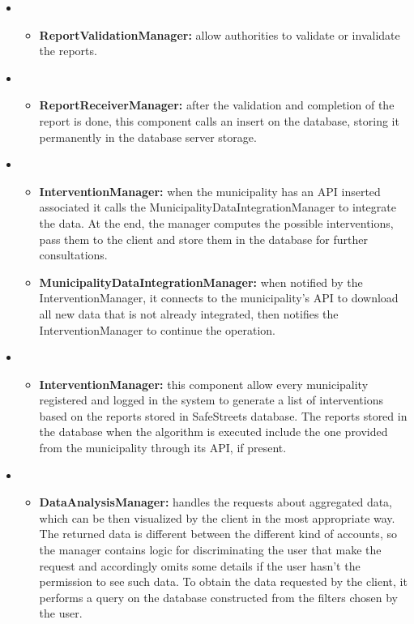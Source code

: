 \bigskip
\begin{itemize}[label={}]
	\item {}
	\begin{itemize}
		\item \textbf{ReportValidationManager:} allow authorities to validate or invalidate the reports.
	\end{itemize}
	\item {}
	\begin{itemize}
		\item \textbf{ReportReceiverManager:} after the validation and completion of the report is done, this component calls an insert on the database, storing it permanently in the database server storage.
	\end{itemize}
	\item {}
	\begin{itemize}
		\item \textbf{InterventionManager:}  when the municipality has an API inserted associated it calls the MunicipalityDataIntegrationManager to integrate the data. At the end, the manager computes the possible interventions, pass them to the client and store them in the database for further consultations.
		\item \textbf{MunicipalityDataIntegrationManager:} when notified by the InterventionManager, it connects to the municipality's API to download all new data that is not already integrated, then notifies the InterventionManager to continue the operation.
	\end{itemize}
	\item {}
	\begin{itemize}
		\item \textbf{InterventionManager:} this component allow every municipality registered and logged in the system to generate a list of interventions based on the reports stored in SafeStreets database. The reports stored in the database when the algorithm is executed include the one provided from the municipality through its API, if present.
	\end{itemize}
	\item {}
	\begin{itemize}
		\item \textbf{DataAnalysisManager:} handles the requests about aggregated data, which can be then visualized by the client in the most appropriate way. The returned data is different between the different kind of accounts, so the manager contains logic for discriminating the user that make the request and accordingly omits some details if the user hasn't the permission to see such data. To obtain the data requested by the client, it performs a query on the database constructed from the filters chosen by the user.

\end{itemize}
\end{itemize}
